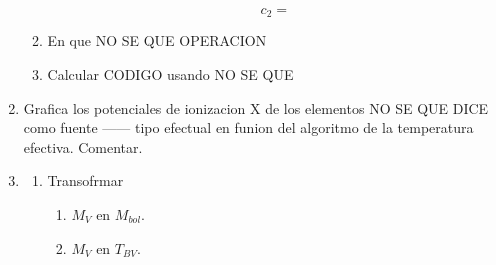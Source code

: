 \documentclass[10pt,spanish,a4paper,1p]{practice}
\begin{document}
\begin{enumerate}[wide, labelwidth=!, labelindent=0pt, label=\textbf{\textrm{\arabic*)}}, ref=\arabic*]
\begin{enumerate}
                $$
                    c_2 =
                $$

            \item\label{prob:12:b} En que NO SE QUE OPERACION

            \item\label{prob:12:c} Calcular CODIGO usando NO SE QUE
       \end{enumerate}

    \item\label{prob:13} Grafica los potenciales de ionizacion X de los elementos NO SE QUE DICE como fuente ------ tipo efectual en funion del algoritmo de la temperatura efectiva. Comentar.

    \item\label{prob:14}\hfill
        \begin{enumerate}
            \item \label{prob:14:a} Transofrmar
                \begin{enumerate}
                    \item\label{prob:14:a:i} $M_{V}$ en $M_{bol}$.
                    \item\label{prob:14:a:ii} $M_{V}$ en $T_{BV}$.
                \end{enumerate}
        \end{enumerate}
    \end{enumerate}
\end{document}

